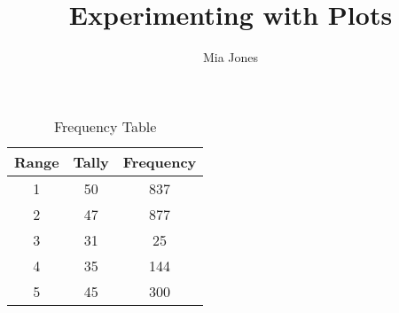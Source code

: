 \documentclass[12pt]{article}
\newenvironment{problem}[2][Problem]{\begin{trivlist}
\item[\hskip \labelsep {\bfseries #1}\hskip \labelsep {\bfseries #2.}]}{\end{trivlist}}
\begin{document}
\title{Experimenting with Plots}
\author{Mia Jones}

\maketitle


\begin{problem}{1}

\begin{table}[ht]
\caption{Frequency Table}
\centering
\begin{tabular}{c c c}
\hline\hline 
Range & Tally & Frequency \\ [0.5ex]
\hline
1 & 50 & 837\\
\hline
2 & 47 & 877\\
\hline
3 & 31 & 25\\
\hline
4 & 35 & 144\\
\hline
5 & 45 & 300\\ [1ex] 
\hline 
\end{tabular}
\label{table:nonlin}
\end{table}

\end{problem}
\end{document}
